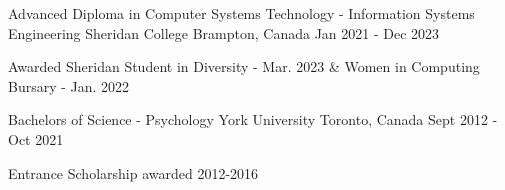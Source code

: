 \begin{cventries}
  \cventry
    {Advanced Diploma in Computer Systems Technology - Information Systems Engineering}
    {Sheridan College}
    {Brampton, Canada}
    {Jan 2021 - Dec 2023}
    {
      \begin{cvitems}
        \item{Awarded Sheridan Student in Diversity - Mar. 2023 \& Women in Computing Bursary - Jan. 2022}
      \end{cvitems}
    }
   \cventry
    {Bachelors of Science - Psychology}
    {York University}
    {Toronto, Canada}
    {Sept 2012 - Oct 2021}
    { 
      \begin{cvitems}
        \item{Entrance Scholarship awarded 2012-2016}
      \end{cvitems}}
\end{cventries}
